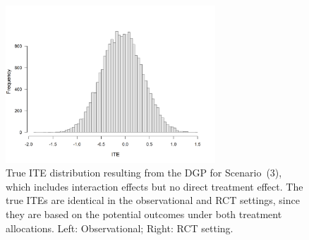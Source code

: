 % 


\begin{figure}[htbp]
\centering
\includegraphics[width=0.7\textwidth]{img/results/observ_scenario3_ite_distribution_dgp.png}
\caption{True ITE distribution resulting from the DGP for Scenario~(3), which includes interaction effects but no direct treatment effect. The true ITEs are identical in the observational and RCT settings, since they are based on the potential outcomes under both treatment allocations. Left: Observational; Right: RCT setting.}
\label{fig:scenario3_ite_distribution_dgp}
\end{figure}



